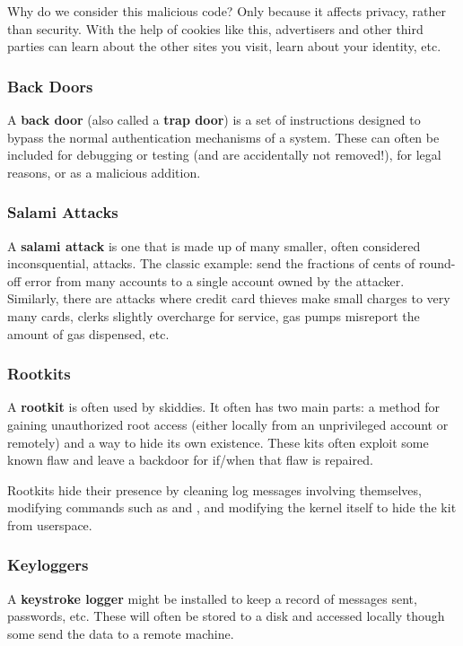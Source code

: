 \documentclass[12pt]{article}
\begin{document}
Why do we consider this malicious code? Only because it affects privacy, rather than security. With the help of cookies like this, advertisers and other third parties can learn about the other sites you visit, learn about your identity, etc.

\subsubsection{Back Doors}
A {\bf back door} (also called a {\bf trap door}) is a set of instructions designed to bypass the normal authentication mechanisms of a system. These can often be included for debugging or testing (and are accidentally not removed!), for legal reasons, or as a malicious addition.

\subsubsection{Salami Attacks}
A {\bf salami attack} is one that is made up of many smaller, often considered inconsquential, attacks. The classic example: send the fractions of cents of round-off error from many accounts to a single account owned by the attacker. Similarly, there are attacks where credit card thieves make small charges to very many cards, clerks slightly overcharge for service, gas pumps misreport the amount of gas dispensed, etc.

\subsubsection{Rootkits}
A {\bf rootkit} is often used by skiddies. It often has two main parts: a method for gaining unauthorized root access (either locally from an unprivileged account or remotely) and a way to hide its own existence. These kits often exploit some known flaw and leave a backdoor for if/when that flaw is repaired.

Rootkits hide their presence by cleaning log messages involving themselves, modifying commands such as  and , and modifying the kernel itself to hide the kit from userspace.

\subsubsection{Keyloggers}
A {\bf keystroke logger} might be installed to keep a record of messages sent, passwords, etc. These will often be stored to a disk and accessed locally though some send the data to a remote machine.
\end{document}
